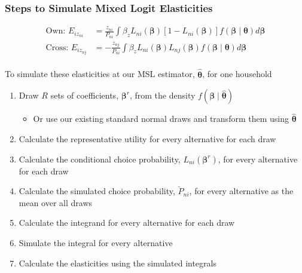 \documentclass{beamer}\usepackage[]{graphicx}\usepackage[]{color}
\begin{document}
\begin{frame}\frametitle{Steps to Simulate Mixed Logit Elasticities}
	\vspace{-3ex}
	\begin{align*}
    	\text{Own: } E_{iz_{ni}} & = \frac{z_{ni}}{P_{ni}} \int \beta_z L_{ni}(\bm{\beta}) [1 - L_{ni}(\bm{\beta})] f(\bm{\beta} \mid \bm{\theta}) d \bm{\beta} \\
    	\text{Cross: } E_{iz_{nj}} & = - \frac{z_{nj}}{P_{ni}} \int \beta_z L_{ni}(\bm{\beta}) L_{nj}(\bm{\beta}) f(\bm{\beta} \mid \bm{\theta}) d \bm{\beta}
    \end{align*} \\
    \vspace{-1ex}
    To simulate these elasticities at our MSL estimator, $\widehat{\bm{\theta}}$, for one household
    \begin{enumerate}
        \item Draw $R$ sets of coefficients, $\bm{\beta}^r$, from the density $f(\bm{\beta} \mid \widehat{\bm{\theta}})$
        \begin{itemize}
        	\item Or use our existing standard normal draws and transform them using $\widehat{\bm{\theta}}$
        \end{itemize}
        \item Calculate the representative utility for every alternative for each draw
        \item Calculate the conditional choice probability, $L_{ni}(\bm{\beta}^r)$, for every alternative for each draw
        \item Calculate the simulated choice probability, $\check{P}_{ni}$, for every alternative as the mean over all draws
        \item Calculate the integrand for every alternative for each draw
        \item Simulate the integral for every alternative
        \item Calculate the elasticities using the simulated integrals
    \end{enumerate}
\end{frame}
\end{document}
